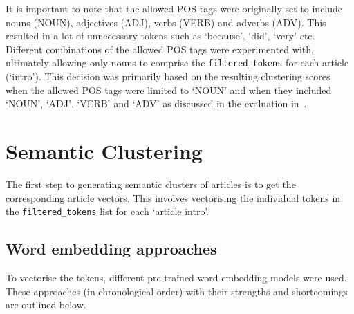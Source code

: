 It is important to note that the allowed POS tags were originally set to include nouns (NOUN), adjectives (ADJ), verbs (VERB) and adverbs (ADV). This resulted in a lot of unnecessary tokens such as `because', `did', `very' etc. Different combinations of the allowed POS tags were experimented with, ultimately allowing only nouns to comprise the \texttt{filtered\_tokens} for each article (`intro'). This decision was primarily based on the resulting clustering scores when the allowed POS tags were limited to `NOUN' and when they included `NOUN', `ADJ', `VERB' and `ADV' as discussed in the evaluation in~.

\section{Semantic Clustering} \label{s:semantic_clustering}

The first step to generating semantic clusters of articles is to get the corresponding article vectors. This involves vectorising the individual tokens in the \texttt{filtered\_tokens} list for each `article intro'.

\subsection{Word embedding approaches} \label{word_embed_approaches}
To vectorise the tokens, different pre-trained word embedding models were used. These approaches (in chronological order) with their strengths and shortcomings are outlined below.

